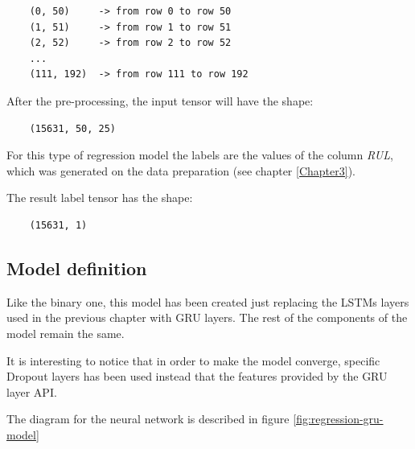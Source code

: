\begin{verbatim}
    (0, 50)     -> from row 0 to row 50
    (1, 51)     -> from row 1 to row 51
    (2, 52)     -> from row 2 to row 52
    ...
    (111, 192)  -> from row 111 to row 192
\end{verbatim}

After the pre-processing, the input tensor will have the shape:

\begin{verbatim}
    (15631, 50, 25)
\end{verbatim}

For this type of regression model the labels are the values of the column \textit{RUL}, which was generated on the data preparation (see chapter \ref{Chapter3}).

The result label tensor has the shape:

\begin{verbatim}
    (15631, 1)
\end{verbatim}


\subsection{Model definition}

Like the binary one, this model has been created just replacing the LSTMs layers used in the previous chapter with GRU layers.
The rest of the components of the model remain the same.

It is interesting to notice that in order to make the model converge, specific Dropout layers has been used instead that the features provided by the GRU layer API.

The diagram for the neural network is described in figure \ref{fig:regression-gru-model}

